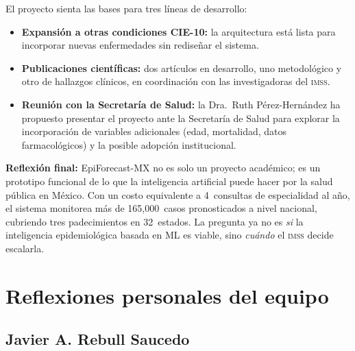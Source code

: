 \documentclass[12pt, letterpaper]{article}
\newenvironment{insightbox}[1][]{\par\medskip\begin{lrbox}{\boxcontents}\begin{minipage}{\dimexpr\textwidth-12pt}\setlength{\emergencystretch}{5em}\setlength{\parskip}{6pt}}{\end{minipage}\end{lrbox}\noindent\colorbox{lightgreen}{\usebox{\boxcontents}}\par\medskip}
\newcommand{\imss}{\textnormal{\textsc{imss}}}
\begin{document}
El proyecto sienta las bases para tres líneas de desarrollo:

\begin{itemize}
  \item \textbf{Expansión a otras condiciones CIE-10:} la arquitectura está lista para incorporar nuevas enfermedades sin rediseñar el sistema.
  \item \textbf{Publicaciones científicas:} dos artículos en desarrollo, uno metodológico y otro de hallazgos clínicos, en coordinación con las investigadoras del \imss{}.
  \item \textbf{Reunión con la Secretaría de Salud:} la Dra.~Ruth Pérez-Hernández ha propuesto presentar el proyecto ante la Secretaría de Salud para explorar la incorporación de variables adicionales (edad, mortalidad, datos farmacológicos) y la posible adopción institucional.
\end{itemize}

\begin{insightbox}
\textbf{Reflexión final:} EpiForecast-MX no es solo un proyecto académico; es un prototipo funcional de lo que la inteligencia artificial puede hacer por la salud pública en México. Con un costo equivalente a 4~consultas de especialidad al año, el sistema monitorea más de 165,000~casos pronosticados a nivel nacional, cubriendo tres padecimientos en 32~estados. La pregunta ya no es \emph{si} la inteligencia epidemiológica basada en ML es viable, sino \emph{cuándo} el \imss{} decide escalarla.
\end{insightbox}

\newpage
\section{Reflexiones personales del equipo}\label{sec:reflexiones}

\subsection{Javier A. Rebull Saucedo}
\end{document}
